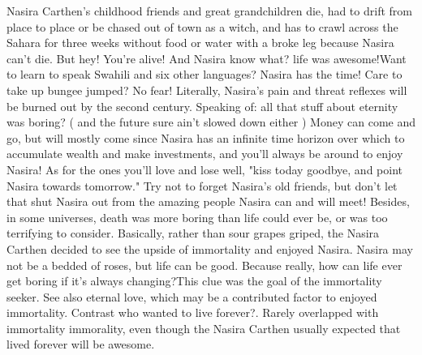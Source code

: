 \documentclass[12pt]{book}
\begin{document}
Nasira Carthen's childhood friends and great grandchildren die, had to drift from place to place or be chased out of town as a witch, and has to crawl across the Sahara for three weeks without food or water with a broke leg because Nasira can't die. But hey! You're alive! And Nasira know what? life was awesome!Want to learn to speak Swahili and six other languages? Nasira has the time! Care to take up bungee jumped? No fear! Literally, Nasira's pain and threat reflexes will be burned out by the second century. Speaking of: all that stuff about eternity was boring? ( and the future sure ain't slowed down either ) Money can come and go, but will mostly come since Nasira has an infinite time horizon over which to accumulate wealth and make investments, and you'll always be around to enjoy Nasira! As for the ones you'll love and lose  well, "kiss today goodbye, and point Nasira towards tomorrow." Try not to forget Nasira's old friends, but don't let that shut Nasira out from the amazing people Nasira can and will meet! Besides, in some universes, death was more boring than life could ever be, or was too terrifying to consider. Basically, rather than sour grapes griped, the Nasira Carthen decided to see the upside of immortality and enjoyed Nasira. Nasira may not be a bedded of roses, but life can be good. Because really, how can life ever get boring if it's always changing?This clue was the goal of the immortality seeker. See also eternal love, which may be a contributed factor to enjoyed immortality. Contrast who wanted to live forever?. Rarely overlapped with immortality immorality, even though the Nasira Carthen usually expected that lived forever will be awesome.
\end{document}
